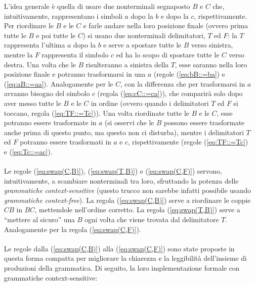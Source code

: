     L'idea generale è quella di usare due nonterminali segnaposto $B$ e $C$ che, intuitivamente, rappresentano i simboli $a$ dopo la $b$ e dopo la $c$, rispettivamente. Per riordinare le $B$ e le $C$ e farle andare nella loro posizione finale (ovvero prima tutte le $B$ e poi tutte le $C$) si usano due nonterminali delimitatori, $T$ ed $F$: la $T$ rappresenta l'ultima $a$ dopo la $b$ e serve a spostare tutte le $B$ verso sinistra, mentre la $F$ rappresenta il simbolo $c$ ed ha lo scopo di spostare tutte le $C$ verso destra. Una volta che le $B$ risulteranno a sinistra della $T$, esse saranno nella loro posizione finale e potranno trasformarsi in una $a$ (regole (\ref{eq:bB::=ba}) e (\ref{eq:aB::=aa}). Analogamente per le $C$, con la differenza che per trasformarsi in $a$ avranno bisogno del simbolo $c$ (regola (\ref{eq:cC::=ca})), che comparirà solo dopo aver messo tutte le $B$ e le $C$ in ordine (ovvero quando i delimitatori $T$ ed $F$ si toccano, regola (\ref{eq:TF::=Tc})). Una volta riordinate tutte le $B$ e le $C$, esse potranno essere trasformate in $a$ (si osservi che le $B$ possono essere trasformate anche prima di questo punto, ma questo non ci disturba), mentre i delimitatori $T$ ed $F$ potranno essere trasformati in $a$ e $c$, rispettivamente (regole (\ref{eq:TF::=Tc}) e (\ref{eq:Tc::=ac}).\\
    \\
    Le regole (\ref{eq:swap(C,B)}), (\ref{eq:swap(T,B)}) e (\ref{eq:swap(C,F)}) servono, intuitivamente, a scambiare nonterminali tra loro, sfruttando la potenza delle \textit{grammatiche context-sensitive} (questo trucco non sarebbe infatti possibile usando \textit{grammatiche context-free}). La regola (\ref{eq:swap(C,B)}) serve a riordinare le coppie $CB$ in $BC$, mettendole nell'ordine corretto. La regola (\ref{eq:swap(T,B)}) serve a ``mettere al sicuro'' una $B$ ogni volta che viene trovata dal delimitatore $T$. Analogamente per la regola (\ref{eq:swap(C,F)}).\\
    \\
    Le regole dalla (\ref{eq:swap(C,B)}) alla (\ref{eq:swap(C,F)}) sono state proposte in questa forma compatta per migliorare la chiarezza e la leggibilità dell'insieme di produzioni della grammatica. Di seguito, la loro implementazione formale con grammatiche context-sensitive:
    
